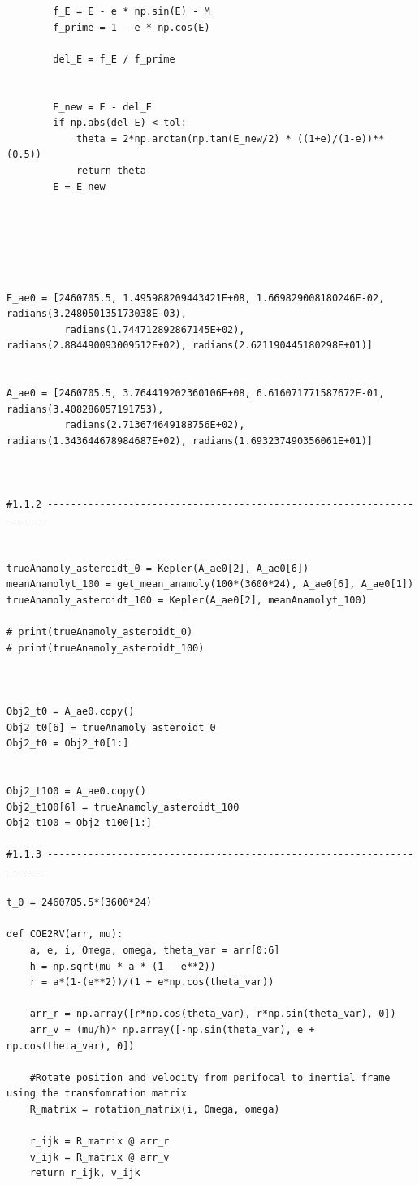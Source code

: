 \documentclass[a4paper, 12pt]{article}  %
\begin{document}
\begin{lstlisting}
        f_E = E - e * np.sin(E) - M
        f_prime = 1 - e * np.cos(E)
        
        del_E = f_E / f_prime
        
        
        E_new = E - del_E
        if np.abs(del_E) < tol:
            theta = 2*np.arctan(np.tan(E_new/2) * ((1+e)/(1-e))**(0.5))
            return theta
        E = E_new
 
        



    
E_ae0 = [2460705.5, 1.495988209443421E+08, 1.669829008180246E-02, radians(3.248050135173038E-03), 
          radians(1.744712892867145E+02), radians(2.884490093009512E+02), radians(2.621190445180298E+01)]


A_ae0 = [2460705.5, 3.764419202360106E+08, 6.616071771587672E-01, radians(3.408286057191753),
          radians(2.713674649188756E+02), radians(1.343644678984687E+02), radians(1.693237490356061E+01)]



#1.1.2 ----------------------------------------------------------------------


trueAnamoly_asteroidt_0 = Kepler(A_ae0[2], A_ae0[6])
meanAnamolyt_100 = get_mean_anamoly(100*(3600*24), A_ae0[6], A_ae0[1])
trueAnamoly_asteroidt_100 = Kepler(A_ae0[2], meanAnamolyt_100)

# print(trueAnamoly_asteroidt_0)
# print(trueAnamoly_asteroidt_100)



Obj2_t0 = A_ae0.copy()
Obj2_t0[6] = trueAnamoly_asteroidt_0
Obj2_t0 = Obj2_t0[1:]


Obj2_t100 = A_ae0.copy()
Obj2_t100[6] = trueAnamoly_asteroidt_100
Obj2_t100 = Obj2_t100[1:]

#1.1.3 ----------------------------------------------------------------------

t_0 = 2460705.5*(3600*24)

def COE2RV(arr, mu):
    a, e, i, Omega, omega, theta_var = arr[0:6]
    h = np.sqrt(mu * a * (1 - e**2))
    r = a*(1-(e**2))/(1 + e*np.cos(theta_var))
    
    arr_r = np.array([r*np.cos(theta_var), r*np.sin(theta_var), 0])
    arr_v = (mu/h)* np.array([-np.sin(theta_var), e + np.cos(theta_var), 0])

    #Rotate position and velocity from perifocal to inertial frame using the transfomration matrix
    R_matrix = rotation_matrix(i, Omega, omega)
   
    r_ijk = R_matrix @ arr_r
    v_ijk = R_matrix @ arr_v
    return r_ijk, v_ijk





\end{lstlisting}
\end{document}
